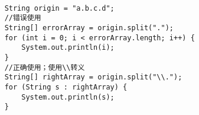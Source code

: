 \begin{lstlisting}[style=cjava]

    String origin = "a.b.c.d";
    //错误使用
    String[] errorArray = origin.split(".");
    for (int i = 0; i < errorArray.length; i++) {
        System.out.println(i);
    }
    //正确使用；使用\\转义
    String[] rightArray = origin.split("\\.");
    for (String s : rightArray) {
        System.out.println(s);
    }

\end{lstlisting}





























































